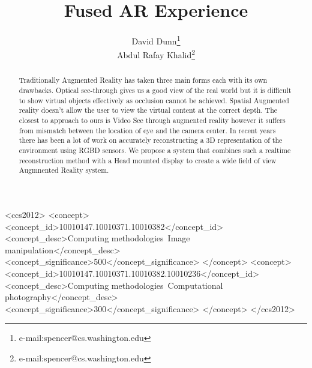 \documentclass{acmsiggraph}
\title{Fused AR Experience}
\author{David Dunn\thanks{e-mail:spencer@cs.washington.edu}\\Abdul Rafay Khalid\thanks{e-mail:spencer@cs.washington.edu}}
\begin{document}


\maketitle

\begin{abstract}
Traditionally Augmented Reality has taken three main forms each with its own drawbacks. Optical see-through gives us a good view of the real world but it is difficult to show virtual objects effectively as occlusion cannot be achieved. Spatial Augmented reality doesn't allow the user to view the virtual content at the correct depth. The closest to approach to ours is Video See through augmented reality however it suffers from mismatch between the location of eye and the camera center. In recent years there has been a lot of work on accurately reconstructing a 3D representation of the environment using RGBD sensors. We propose a system that combines such a realtime reconstruction method with a Head mounted display to create a wide field of view Augmnented Reality system. 

\end{abstract}

%
%
\begin{CCSXML}
<ccs2012>
<concept>
<concept_id>10010147.10010371.10010382</concept_id>
<concept_desc>Computing methodologies~Image manipulation</concept_desc>
<concept_significance>500</concept_significance>
</concept>
<concept>
<concept_id>10010147.10010371.10010382.10010236</concept_id>
<concept_desc>Computing methodologies~Computational photography</concept_desc>
<concept_significance>300</concept_significance>
</concept>
</ccs2012>
\end{CCSXML}
\end{document}

